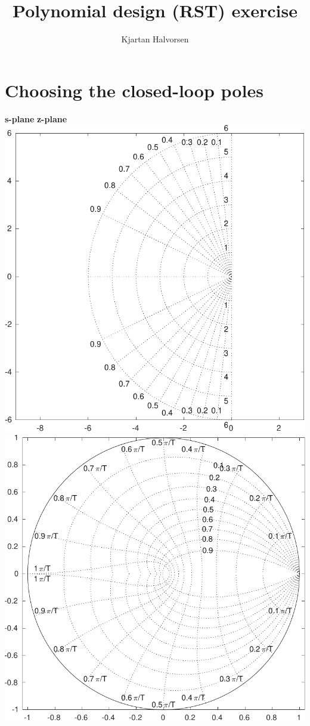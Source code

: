 \documentclass[letterpaper,fleqn]{scrartcl}
\author{Kjartan Halvorsen}
\date{}
\title{Polynomial design (RST) exercise}
\begin{document}
\maketitle

\section*{Choosing the closed-loop poles}
\label{sec-1}
\begin{center}
\textbf{s-plane} \hspace*{0.4\linewidth} \textbf{z-plane}\\
\includegraphics[height=0.34\textheight]{../figures/sgrid-crop} \hspace*{3mm}
\includegraphics[height=0.34\textheight]{../figures/zgrid-crop}\\
\end{center}
\end{document}
